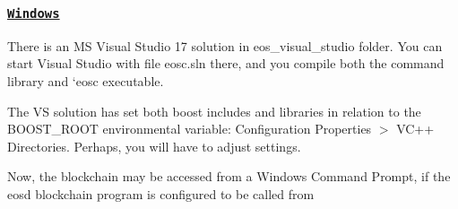 \label{_windows}%
 \subsubsection*{\href{#toc}{\tt Windows}}

There is an MS Visual Studio 17 solution in {\ttfamily eos\+\_\+visual\+\_\+studio} folder. You can start Visual Studio with file {\ttfamily eosc.\+sln} there, and you compile both the command library and `eosc\textquotesingle{} executable.

The VS solution has set both boost includes and libraries in relation to the {\ttfamily B\+O\+O\+S\+T\+\_\+\+R\+O\+OT} environmental variable\+: Configuration Properties $>$ V\+C++ Directories. Perhaps, you will have to adjust settings.

Now, the blockchain may be accessed from a Windows Command Prompt, if the {\ttfamily eosd} blockchain program is configured to be called from 